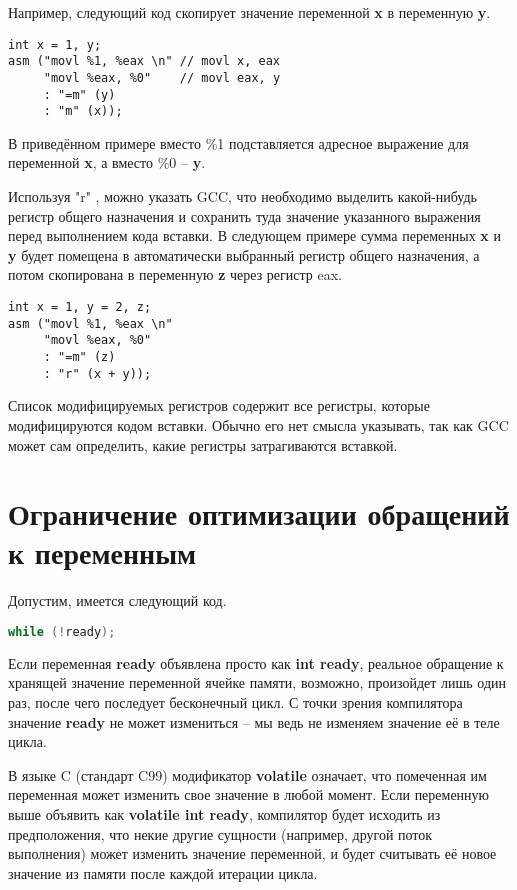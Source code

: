 Например, следующий код скопирует значение переменной \textbf{x} в переменную \textbf{y}.
\begin{lstlisting}[language={[x86masm]Assembler}]
int x = 1, y;
asm ("movl %1, %eax \n" // movl x, eax
     "movl %eax, %0"    // movl eax, y
     : "=m" (y)
     : "m" (x));
\end{lstlisting}

В приведённом примере вместо \%1 подставляется адресное выражение для
переменной \textbf{x}, а вместо \%0 -- \textbf{y}.

Используя "r" , можно указать GCC, что необходимо выделить какой-нибудь
регистр общего назначения и сохранить туда значение указанного выражения
перед выполнением кода вставки. В следующем примере сумма переменных
\textbf{x} и \textbf{y} будет помещена в автоматически выбранный регистр общего назначения,
а потом скопирована в переменную \textbf{z} через регистр eax.

\begin{lstlisting}[language={[x86masm]Assembler}]
int x = 1, y = 2, z;
asm ("movl %1, %eax \n"
     "movl %eax, %0"
     : "=m" (z)
     : "r" (x + y));
\end{lstlisting}

Список модифицируемых регистров содержит все регистры, которые модифицируются
кодом вставки. Обычно его нет смысла указывать, так как GCC может сам определить,
какие регистры затрагиваются вставкой.

\section{Ограничение оптимизации обращений к переменным}
Допустим, имеется следующий код.
\begin{lstlisting}[language=C]
while (!ready);
\end{lstlisting}

Если переменная \textbf{ready} объявлена просто как \textbf{int ready}, реальное
обращение к хранящей значение переменной ячейке памяти, возможно,
произойдет лишь один раз, после чего последует бесконечный цикл. С
точки зрения компилятора значение \textbf{ready} не может измениться -- мы ведь не
изменяем значение её в теле цикла.

В языке C (стандарт C99) модификатор \textbf{volatile} означает, что
помеченная им переменная может изменить свое значение в любой момент.
Если переменную выше объявить как \textbf{volatile int ready}, компилятор будет
исходить из предположения, что некие другие сущности (например, другой поток
выполнения) может изменить значение переменной, и будет считывать её новое
значение из памяти после каждой итерации цикла.

